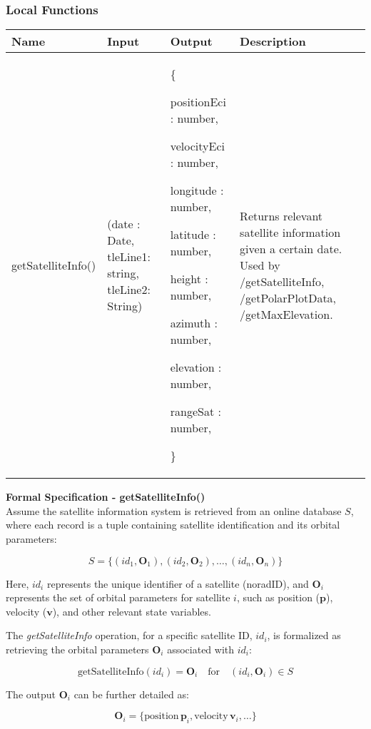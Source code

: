 \documentclass[12pt, titlepage]{article}
\begin{document}
\subsubsection{Local Functions}
\begin{center}
\begin{tabular}{|p{4cm} |p{3cm} |p{5cm} |p{4cm}|}
\hline
\textbf{Name} & \textbf{Input} & \textbf{Output} & \textbf{Description} \\
\hline
getSatelliteInfo() & (date : Date, tleLine1: string, tleLine2: String) & \{

positionEci : number,

velocityEci : number,

longitude : number,

latitude : number,

height : number,

azimuth : number,

elevation : number,

rangeSat : number,

\} & Returns relevant satellite information given a certain date. Used by /getSatelliteInfo, /getPolarPlotData, /getMaxElevation. \\
\hline
\end{tabular}
\end{center}

\textbf{Formal Specification - getSatelliteInfo()} \\
Assume the satellite information system is retrieved from an online database $S$, where each record is a tuple containing satellite identification and its orbital parameters:

\[
S = \{(id_1, \bm{O}_1), (id_2, \bm{O}_2), \ldots, (id_n, \bm{O}_n)\}
\]

Here, $id_i$ represents the unique identifier of a satellite (noradID), and $\bm{O}_i$ represents the set of orbital parameters for satellite $i$, such as position ($\bm{p}$), velocity ($\bm{v}$), and other relevant state variables.

The \textit{getSatelliteInfo} operation, for a specific satellite ID, $id_i$, is formalized as retrieving the orbital parameters $\bm{O}_i$ associated with $id_i$:

\[
\text{getSatelliteInfo}(id_i) = \bm{O}_i \quad \text{for} \quad (id_i, \bm{O}_i) \in S
\]

The output $\bm{O}_i$ can be further detailed as:

\[
\bm{O}_i = \{\text{position} \, \bm{p}_i, \text{velocity} \, \bm{v}_i, \ldots\}
\]
\end{document}

